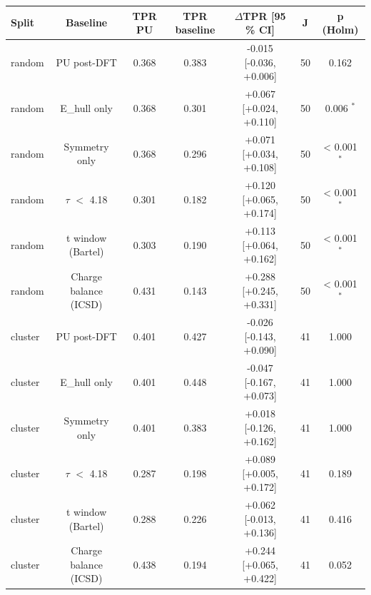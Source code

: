 \begin{tabular}{lcccccc}
\toprule
Split & Baseline & TPR PU & TPR baseline & $\Delta$TPR [95 \% CI] & J & p (Holm) \\
\midrule
random & PU post-DFT & 0.368 & 0.383 & -0.015 [-0.036, +0.006] & 50 & 0.162 \\
random & E\_hull only & 0.368 & 0.301 & +0.067 [+0.024, +0.110] & 50 & 0.006 $^{*}$ \\
random & Symmetry only & 0.368 & 0.296 & +0.071 [+0.034, +0.108] & 50 & < 0.001 $^{*}$ \\
random & $\tau$ $<$ 4.18 & 0.301 & 0.182 & +0.120 [+0.065, +0.174] & 50 & < 0.001 $^{*}$ \\
random & t window (Bartel) & 0.303 & 0.190 & +0.113 [+0.064, +0.162] & 50 & < 0.001 $^{*}$ \\
random & Charge balance (ICSD) & 0.431 & 0.143 & +0.288 [+0.245, +0.331] & 50 & < 0.001 $^{*}$ \\
cluster & PU post-DFT & 0.401 & 0.427 & -0.026 [-0.143, +0.090] & 41 & 1.000 \\
cluster & E\_hull only & 0.401 & 0.448 & -0.047 [-0.167, +0.073] & 41 & 1.000 \\
cluster & Symmetry only & 0.401 & 0.383 & +0.018 [-0.126, +0.162] & 41 & 1.000 \\
cluster & $\tau$ $<$ 4.18 & 0.287 & 0.198 & +0.089 [+0.005, +0.172] & 41 & 0.189 \\
cluster & t window (Bartel) & 0.288 & 0.226 & +0.062 [-0.013, +0.136] & 41 & 0.416 \\
cluster & Charge balance (ICSD) & 0.438 & 0.194 & +0.244 [+0.065, +0.422] & 41 & 0.052 \\
\bottomrule
\end{tabular}
